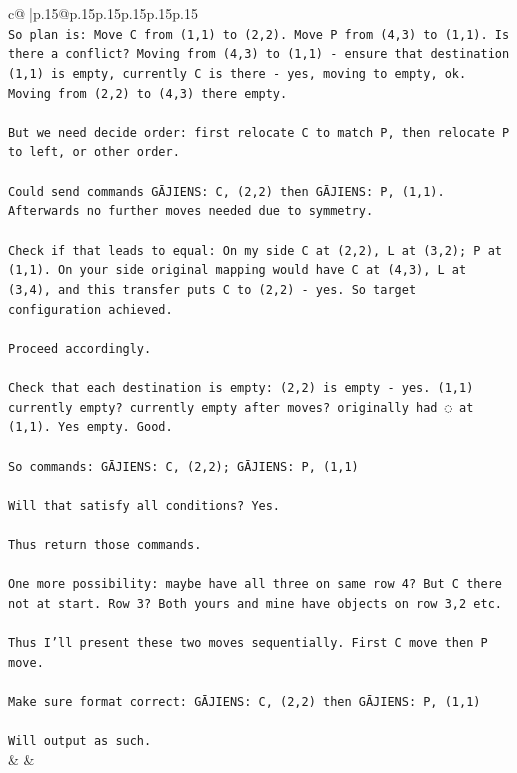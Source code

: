 \documentclass{article}
\begin{document}
{\begin{supertabular}{c@{$\;$}|p{.15\linewidth}@{}p{.15\linewidth}p{.15\linewidth}p{.15\linewidth}p{.15\linewidth}p{.15\linewidth}}
{{{\\ 
\texttt{So plan is: Move C from (1,1) to (2,2). Move P from (4,3) to (1,1). Is there a conflict? Moving from (4,3) to (1,1) {-} ensure that destination (1,1) is empty, currently C is there {-} yes, moving to empty, ok. Moving from (2,2) to (4,3) there empty.} \\
\\ 
\texttt{But we need decide order: first relocate C to match P, then relocate P to left, or other order.} \\
\\ 
\texttt{Could send commands GĀJIENS: C, (2,2) then GĀJIENS: P, (1,1). Afterwards no further moves needed due to symmetry.} \\
\\ 
\texttt{Check if that leads to equal: On my side C at (2,2), L at (3,2); P at (1,1). On your side original mapping would have C at (4,3), L at (3,4), and this transfer puts C to (2,2) {-} yes. So target configuration achieved.} \\
\\ 
\texttt{Proceed accordingly.} \\
\\ 
\texttt{Check that each destination is empty: (2,2) is empty {-} yes. (1,1) currently empty? currently empty after moves? originally had ◌ at (1,1). Yes empty. Good.} \\
\\ 
\texttt{So commands: GĀJIENS: C, (2,2); GĀJIENS: P, (1,1)} \\
\\ 
\texttt{Will that satisfy all conditions? Yes.} \\
\\ 
\texttt{Thus return those commands.} \\
\\ 
\texttt{One more possibility: maybe have all three on same row 4? But C there not at start. Row 3? Both yours and mine have objects on row 3,2 etc.} \\
\\ 
\texttt{Thus I'll present these two moves sequentially. First C move then P move.} \\
\\ 
\texttt{Make sure format correct: GĀJIENS: C, (2,2) then GĀJIENS: P, (1,1)} \\
\\ 
\texttt{Will output as such.} \\
            }
        }
    }
    & & \\ \\


\end{supertabular}}
\end{document}
